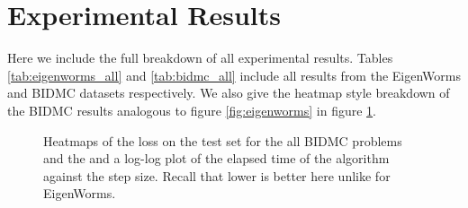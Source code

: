 \section{Experimental Results} \label{apx:results}
Here we include the full breakdown of all experimental results. Tables \ref{tab:eigenworms_all} and \ref{tab:bidmc_all} include all results from the EigenWorms and BIDMC datasets respectively. We also give the heatmap style breakdown of the BIDMC results analogous to figure \ref{fig:eigenworms} in figure \ref{fig:bidmc_heatmap}.







\begin{figure}[htp]

    
    

    \caption{Heatmaps of the loss on the test set for the all BIDMC problems and the and a log-log plot of the elapsed time of the algorithm against the step size. Recall that lower is better here unlike for EigenWorms.}
    \label{fig:bidmc_heatmap}
    
\end{figure}
